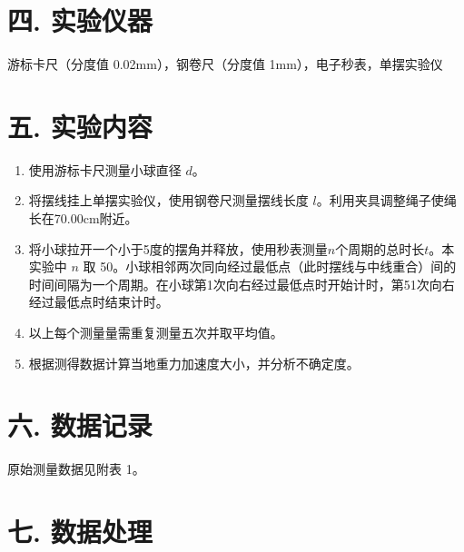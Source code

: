 \documentclass[12pt,a4paper]{article}
\begin{document}
	\section*{\textbf{{四. 实验仪器}}}
	游标卡尺（分度值 0.02mm），钢卷尺（分度值 1mm），电子秒表，单摆实验仪

	\section*{\textbf{{五. 实验内容}}}

	\begin{enumerate}
		\item 使用游标卡尺测量小球直径 $d$。
		\item 将摆线挂上单摆实验仪，使用钢卷尺测量摆线长度 $l$。利用夹具调整绳子使绳长在70.00cm附近。
		\item 将小球拉开一个小于5度的摆角并释放，使用秒表测量$n$个周期的总时长$t$。本实验中 $n$ 取 50。小球相邻两次同向经过最低点（此时摆线与中线重合）间的时间间隔为一个周期。在小球第1次向右经过最低点时开始计时，第51次向右经过最低点时结束计时。
		\item 以上每个测量量需重复测量五次并取平均值。
		\item 根据测得数据计算当地重力加速度大小，并分析不确定度。
	
	\end{enumerate}
	\section*{\textbf{{六. 数据记录}}}
	
	原始测量数据见附表 1。

	\section*{\textbf{{七. 数据处理}}}
\end{document}
